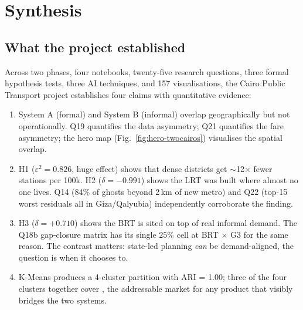 
\section{Synthesis}
\label{sec:synthesis}

\subsection{What the project established}

Across two phases, four notebooks, twenty-five research questions,
three formal hypothesis tests, three AI techniques, and 157
visualisations, the Cairo Public Transport project establishes four
claims with quantitative evidence:

\begin{enumerate}
 \item {}
 System A (formal) and System B (informal) overlap geographically
 but not operationally. Q19 quantifies the data asymmetry; Q21
 quantifies the fare asymmetry; the hero map (Fig.~\ref{fig:hero-twocairos})
 visualises the spatial overlap.

 \item {}
 H1 ($\varepsilon^2 = 0.826$, huge effect) shows that dense
 districts get $\sim$12$\times$ fewer stations per 100k.
 H2 ($\delta = -0.991$) shows the LRT was built where almost
 no one lives. Q14 (84\% of ghosts beyond 2\,km of new metro)
 and Q22 (top-15 worst residuals all in Giza/Qalyubia)
 independently corroborate the finding.

 \item {}
 H3 ($\delta = +0.710$) shows the BRT is sited on top of real
 informal demand. The Q18b gap-closure matrix has its single
 $25\%$ cell at BRT $\times$ G3 for the same reason. The
 contrast matters: state-led planning \emph{can} be
 demand-aligned, the question is when it chooses to.

 \item {}
 K-Means produces a 4-cluster partition with ARI = 1.00; three
 of the four clusters together cover , the addressable market for any
 product that visibly bridges the two systems.
\end{enumerate}

